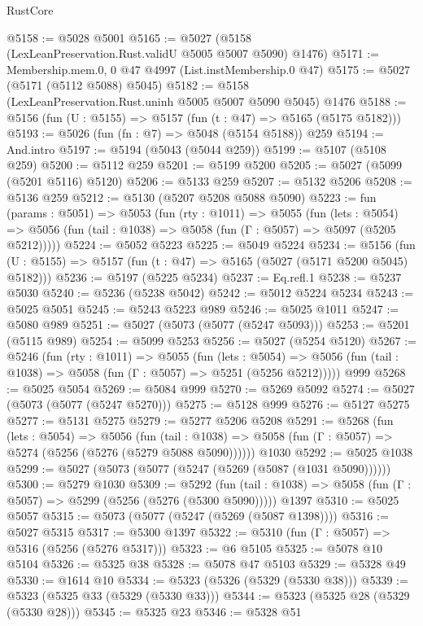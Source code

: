 \begin{lexlean}{RustCore}
\begin{coremodule}
@5158 := @5028 @5001
@5165 := @5027 (@5158 (LexLeanPreservation.Rust.validU @5005 @5007 @5090) @1476)
@5171 := Membership.mem.{0, 0} @47 @4997 (List.instMembership.{0} @47)
@5175 := @5027 (@5171 (@5112 @5088) @5045)
@5182 := @5158 (LexLeanPreservation.Rust.uninh @5005 @5007 @5090 @5045) @1476
@5188 := @5156 (fun (U : @5155) => @5157 (fun (t : @47) => @5165 (@5175 @5182)))
@5193 := @5026 (fun (fn : @7) => @5048 (@5154 @5188)) @259
@5194 := And.intro
@5197 := @5194 (@5043 (@5044 @259))
@5199 := @5107 (@5108 @259)
@5200 := @5112 @259
@5201 := @5199 @5200
@5205 := @5027 (@5099 (@5201 @5116) @5120)
@5206 := @5133 @259
@5207 := @5132 @5206
@5208 := @5136 @259
@5212 := @5130 (@5207 @5208 @5088 @5090)
@5223 := fun (params : @5051) =>
  @5053
    (fun (rty : @1011) =>
    @5055
      (fun (lets : @5054) =>
      @5056 (fun (tail : @1038) => @5058 (fun (Γ : @5057) => @5097 (@5205 @5212)))))
@5224 := @5052 @5223
@5225 := @5049 @5224
@5234 := @5156 (fun (U : @5155) => @5157 (fun (t : @47) => @5165 (@5027 (@5171 @5200 @5045) @5182)))
@5236 := @5197 (@5225 @5234)
@5237 := Eq.refl.{1}
@5238 := @5237 @5030
@5240 := @5236 (@5238 @5042)
@5242 := @5012 @5224 @5234
@5243 := @5025 @5051
@5245 := @5243 @5223 @989
@5246 := @5025 @1011
@5247 := @5080 @989
@5251 := @5027 (@5073 (@5077 (@5247 @5093)))
@5253 := @5201 (@5115 @989)
@5254 := @5099 @5253
@5256 := @5027 (@5254 @5120)
@5267 := @5246
    (fun (rty : @1011) =>
    @5055
      (fun (lets : @5054) =>
      @5056 (fun (tail : @1038) => @5058 (fun (Γ : @5057) => @5251 (@5256 @5212)))))
    @999
@5268 := @5025 @5054
@5269 := @5084 @999
@5270 := @5269 @5092
@5274 := @5027 (@5073 (@5077 (@5247 @5270)))
@5275 := @5128 @999
@5276 := @5127 @5275
@5277 := @5131 @5275
@5279 := @5277 @5206 @5208
@5291 := @5268
    (fun (lets : @5054) =>
    @5056
      (fun (tail : @1038) => @5058 (fun (Γ : @5057) => @5274 (@5256 (@5276 (@5279 @5088 @5090))))))
    @1030
@5292 := @5025 @1038
@5299 := @5027 (@5073 (@5077 (@5247 (@5269 (@5087 (@1031 @5090))))))
@5300 := @5279 @1030
@5309 := @5292
    (fun (tail : @1038) => @5058 (fun (Γ : @5057) => @5299 (@5256 (@5276 (@5300 @5090)))))
    @1397
@5310 := @5025 @5057
@5315 := @5073 (@5077 (@5247 (@5269 (@5087 @1398))))
@5316 := @5027 @5315
@5317 := @5300 @1397
@5322 := @5310 (fun (Γ : @5057) => @5316 (@5256 (@5276 @5317)))
@5323 := @6 @5105
@5325 := @5078 @10 @5104
@5326 := @5325 @38
@5328 := @5078 @47 @5103
@5329 := @5328 @49
@5330 := @1614 @10
@5334 := @5323 (@5326 (@5329 (@5330 @38)))
@5339 := @5323 (@5325 @33 (@5329 (@5330 @33)))
@5344 := @5323 (@5325 @28 (@5329 (@5330 @28)))
@5345 := @5325 @23
@5346 := @5328 @51

\end{coremodule}
\end{lexlean}

